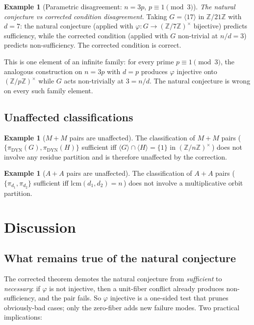 \documentclass[11pt,reqno]{amsart}
\theoremstyle{plain}
\theoremstyle{definition}
\newtheorem{example}[theorem]{Example}
\newcommand{\Z}{\mathbb{Z}}
\newcommand{\Zns}{(\Z/n\Z)^{\times}}
\newcommand{\DYN}{\mathrm{DYN}}
\begin{document}
\begin{example}[Parametric disagreement: $n = 3p$, $p \equiv 1 \pmod 3$]
\emph{The natural conjecture vs corrected condition disagreement.} Taking $G = \langle 17 \rangle$ in $\Z/21\Z$ with $d = 7$: the natural conjecture (applied with $\varphi \colon G \to (\Z/7\Z)^{\times}$ bijective) predicts sufficiency, while the corrected condition (applied with $G$ non-trivial at $n/d = 3$) predicts non-sufficiency. The corrected condition is correct.

This is one element of an infinite family: for every prime $p \equiv 1 \pmod 3$, the analogous construction on $n = 3p$ with $d = p$ produces $\varphi$ injective onto $(\Z/p\Z)^{\times}$ while $G$ acts non-trivially at $3 = n/d$. The natural conjecture is wrong on every such family element.
\end{example}

\subsection{Unaffected classifications}

\begin{example}[$M{+}M$ pairs are unaffected]
The classification of $M{+}M$ pairs (\,$\{\pi_{\DYN}(G), \pi_{\DYN}(H)\}$ sufficient iff $\langle G \rangle \cap \langle H \rangle = \{1\}$ in $\Zns$\,) does not involve any residue partition and is therefore unaffected by the correction.
\end{example}

\begin{example}[$A{+}A$ pairs are unaffected]
The classification of $A{+}A$ pairs (\,$\{\pi_{d_1}, \pi_{d_2}\}$ sufficient iff $\mathrm{lcm}(d_1, d_2) = n$\,) does not involve a multiplicative orbit partition.
\end{example}

\section{Discussion}

\subsection{What remains true of the natural conjecture}

The corrected theorem demotes the natural conjecture from \emph{sufficient} to \emph{necessary}: if $\varphi$ is not injective, then a unit-fiber conflict already produces non-sufficiency, and the pair fails. So $\varphi$ injective is a one-sided test that prunes obviously-bad cases; only the zero-fiber adds new failure modes. Two practical implications:
\end{document}
